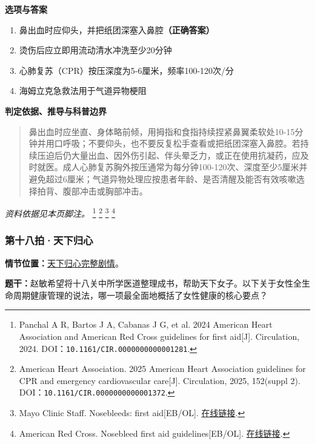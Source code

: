 \textbf{选项与答案}
\begin{enumerate}[label=\Alph*.,leftmargin=*]
  \item 鼻出血时应仰头，并把纸团深塞入鼻腔\textbf{（正确答案）}
  \item 烫伤后应立即用流动清水冲洗至少20分钟
  \item 心肺复苏（CPR）按压深度为5-6厘米，频率100-120次/分
  \item 海姆立克急救法用于气道异物梗阻
\end{enumerate}
\textbf{判定依据、推导与科普边界}
\begin{quote}鼻出血时应坐直、身体略前倾，用拇指和食指持续捏紧鼻翼柔软处10-15分钟并用口呼吸；不要仰头，也不要反复松手查看或把纸团深塞入鼻腔。若持续压迫后仍大量出血、因外伤引起、伴头晕乏力，或正在使用抗凝药，应及时就医。成人心肺复苏胸外按压通常为每分钟100-120次、深度至少5厘米并避免超过6厘米；气道异物处理应按患者年龄、是否清醒及能否有效咳嗽选择拍背、腹部冲击或胸部冲击。\end{quote}
\noindent\textit{资料依据见本页脚注。}
\footnote{Panchal A R, Bartos J A, Cabanas J G, et al. 2024 American Heart Association and American Red Cross guidelines for first aid[J]. Circulation, 2024. DOI：\nolinkurl{10.1161/CIR.0000000000001281}.}
\footnote{American Heart Association. 2025 American Heart Association guidelines for CPR and emergency cardiovascular care[J]. Circulation, 2025, 152(suppl 2). DOI：\nolinkurl{10.1161/CIR.0000000000001372}.}
\footnote{Mayo Clinic Staff. Nosebleeds: first aid[EB/OL]. \href{https://www.mayoclinic.org/first-aid/first-aid-nosebleeds/basics/art-20056683}{在线链接}.}
\footnote{American Red Cross. Nosebleed first aid guidelines[EB/OL]. \href{https://www.redcross.org/take-a-class/resources/guidelines}{在线链接}.}

\subsubsection{第十八拍·天下归心}\label{question:zhaomin:18}
\textbf{情节位置：}\hyperref[plot:zhaomin:18]{天下归心完整剧情}。

\textbf{题干：}赵敏希望将十八关中所学医道整理成书，帮助天下女子。以下关于女性全生命周期健康管理的说法，哪一项最全面地概括了女性健康的核心要点？

